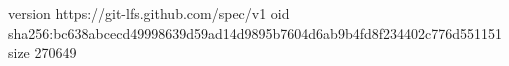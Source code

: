 version https://git-lfs.github.com/spec/v1
oid sha256:bc638abcecd49998639d59ad14d9895b7604d6ab9b4fd8f234402c776d551151
size 270649

